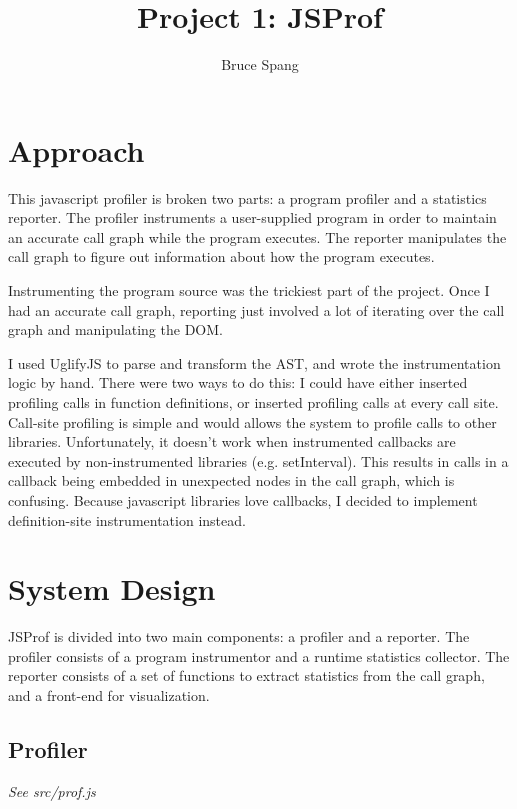\documentclass{article}
\begin{document}
\title{Project 1: JSProf}
\author{Bruce Spang}
\maketitle

\section*{Approach}

This javascript profiler is broken two parts: a program profiler and a statistics reporter. The profiler instruments a user-supplied program in order to maintain an accurate call graph while the program executes. The reporter manipulates the call graph to figure out information about how the program executes.

Instrumenting the program source was the trickiest part of the project. Once I had an accurate call graph, reporting just involved a lot of iterating over the call graph and manipulating the DOM.

I used UglifyJS \cite{uglify} to parse and transform the AST, and wrote the instrumentation logic by hand. There were two ways to do this: I could have either inserted profiling calls in function definitions, or inserted profiling calls at every call site. Call-site profiling is simple and would allows the system to profile calls to other libraries. Unfortunately, it doesn't work when instrumented callbacks are executed by non-instrumented libraries (e.g. setInterval). This results in calls in a callback being embedded in unexpected nodes in the call graph, which is confusing. Because javascript libraries love callbacks, I decided to implement definition-site instrumentation instead.

\section*{System Design}

JSProf is divided into two main components: a profiler and a reporter. The profiler consists of a program instrumentor and a runtime statistics collector. The reporter consists of a set of functions to extract statistics from the call graph, and a front-end for visualization.

\subsection*{Profiler}

\textit{See src/prof.js}
\end{document}
